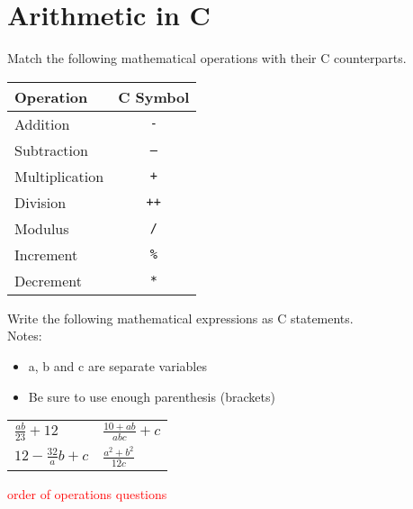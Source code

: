 \documentclass{pass}
\begin{document}
\section*{Arithmetic in C}
\begin{enumerate}[resume]
\item Match the following mathematical operations with their C counterparts.
	\begin{center}
	\begin{tabular}{|l|c|} \hline
	Operation & C Symbol \\ \hline
	Addition & \texttt{-}\\
	Subtraction & \texttt{--}\\
	Multiplication & \texttt{+}\\
	Division & \texttt{++}\\
	Modulus & \texttt{/}\\
	Increment & \texttt{\%}\\
	Decrement & \texttt{*}\\ \hline
	\end{tabular}
	\end{center}

\item Write the following mathematical expressions as C statements.\\ 
Notes:
	\begin{itemize}
	\item a, b and c are separate variables
	\item Be sure to use enough parenthesis (brackets)
	\end{itemize}
	\begin{enumerate}
	\begin{tabularx}{\textwidth}{XX}
        \item $\displaystyle\frac{ab}{23}+12$ &
        \item $\displaystyle\frac{10+ab}{abc}+c$ \\
        \item $12 - \displaystyle\frac{32}{a}b+c$ &
        \item $\displaystyle\frac{a^2+b^2}{12c}$ \\
	\end{tabularx}
	\end{enumerate}
	
\textcolor{red}{\item order of operations questions}

\end{enumerate}
\end{document}

